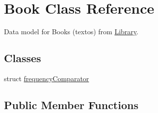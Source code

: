 \hypertarget{class_book}{\section{Book Class Reference}
\label{class_book}
}


Data model for Books (textos) from \hyperlink{class_library}{Library}.  


\subsection*{Classes}
\begin{DoxyCompactItemize}
\item 
struct \hyperlink{struct_book_1_1frequency_comparator}{frequency\+Comparator}
\end{DoxyCompactItemize}
\subsection*{Public Member Functions}
